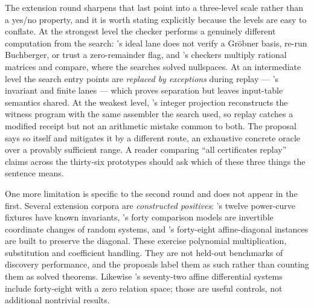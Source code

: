 The extension round sharpens that last point into a three-level scale rather
than a yes/no property, and it is worth stating explicitly because the levels
are easy to conflate. At the strongest level the checker performs a genuinely
different computation from the search: 's ideal lane does not verify a
Gr\"obner basis, re-run Buchberger, or trust a zero-remainder flag, and
's checkers multiply rational matrices and compare, where the searches
solved nullspaces. At an intermediate level the search entry points are
\emph{replaced by exceptions} during replay --- 's invariant and finite
lanes --- which proves separation but leaves input-table semantics shared. At
the weakest level, 's integer projection reconstructs the witness
program with the same assembler the search used, so replay catches a modified
receipt but not an arithmetic mistake common to both. The proposal says so
itself and mitigates it by a different route, an exhaustive concrete oracle over
a provably sufficient range. A reader comparing ``all certificates replay''
claims across the thirty-six prototypes should ask which of these three things
the sentence means.

One more limitation is specific to the second round and does not appear in the
first. Several extension corpora are \emph{constructed positives}: 's
twelve power-curve fixtures have known invariants, 's forty comparison
models are invertible coordinate changes of random systems, and 's
forty-eight affine-diagonal instances are built to preserve the diagonal. These
exercise polynomial multiplication, substitution and coefficient handling. They
are not held-out benchmarks of discovery performance, and the proposals label
them as such rather than counting them as solved theorems. Likewise 's
seventy-two affine differential systems include forty-eight with a zero relation
space; those are useful controls, not additional nontrivial results.

